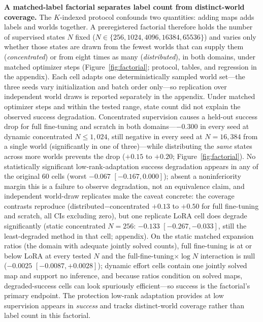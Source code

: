 \documentclass[letterpaper]{article} %
\begin{document}
\textbf{A matched-label factorial separates label count from distinct-world coverage.} The $K$-indexed protocol confounds two quantities: adding maps adds labels and worlds together. A preregistered factorial therefore holds the number of supervised states $N$ fixed ($N \in \{256, 1024, 4096, 16384, 65536\}$) and varies only whether those states are drawn from the fewest worlds that can supply them (\emph{concentrated}) or from eight times as many (\emph{distributed}), in both domains, under matched optimizer steps (Figure~\ref{fig:factorial}; protocol, tables, and regression in the appendix). Each cell adapts one deterministically sampled world set---the three seeds vary initialization and batch order only---so replication over independent world draws is reported separately in the appendix. Under matched optimizer steps and within the tested range, state count did not explain the observed success degradation. Concentrated supervision causes a held-out success drop for full fine-tuning and scratch in both domains---$-0.300$ in every seed at dynamic concentrated $N \leq 1{,}024$, still negative in every seed at $N{=}16{,}384$ from a single world (significantly in one of three)---while distributing the \emph{same} states across more worlds prevents the drop ($+0.15$ to $+0.20$; Figure~\ref{fig:factorial}). No statistically significant low-rank-adaptation success degradation appears in any of the original 60 cells (worst $-0.067$ $[-0.167, 0.000]$); absent a noninferiority margin this is a failure to observe degradation, not an equivalence claim, and independent world-draw replicates make the caveat concrete: the coverage contrasts reproduce (distributed$-$concentrated $+0.13$ to $+0.50$ for full fine-tuning and scratch, all CIs excluding zero), but one replicate LoRA cell does degrade significantly (static concentrated $N{=}256$: $-0.133$ $[-0.267, -0.033]$, still the least-degraded method in that cell; appendix). On the static matched expansion ratios (the domain with adequate jointly solved counts), full fine-tuning is at or below LoRA at every tested $N$ and the full-fine-tuning$\times\log N$ interaction is null ($-0.0025$ $[-0.0087, +0.0028]$); dynamic effort cells contain one jointly solved map and support no inference, and because ratios condition on solved maps, degraded-success cells can look spuriously efficient---so success is the factorial's primary endpoint. The protection low-rank adaptation provides at low supervision appears in \emph{success} and tracks distinct-world coverage rather than label count in this factorial.
\end{document}
